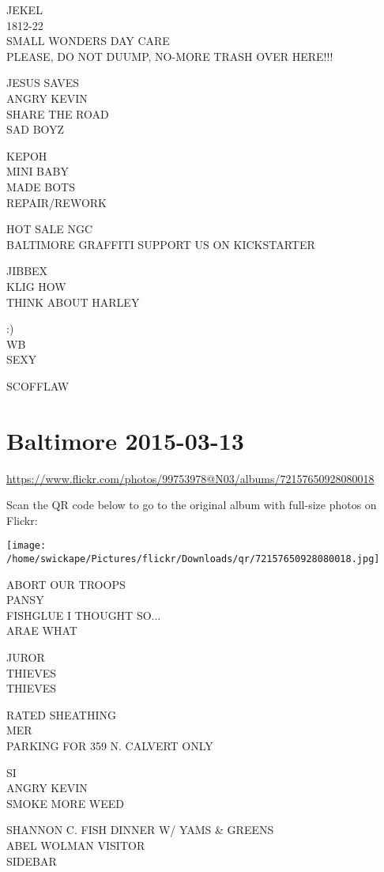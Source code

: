 \documentclass[10pt,letterpaper]{article}
\begin{document}
JEKEL\\
1812{-}22\\
SMALL WONDERS DAY CARE\\
PLEASE, DO NOT DUUMP, NO{-}MORE TRASH OVER HERE!!!

JESUS SAVES\\
ANGRY KEVIN\\
SHARE THE ROAD\\
SAD BOYZ

KEPOH\\
MINI BABY\\
MADE BOTS\\
REPAIR/REWORK

HOT SALE NGC\\
BALTIMORE GRAFFITI SUPPORT US ON KICKSTARTER

JIBBEX\\
KLIG HOW\\
THINK ABOUT HARLEY

:)\\
WB\\
SEXY

SCOFFLAW


\section*{Baltimore 2015-03-13}

\url{https://www.flickr.com/photos/99753978@N03/albums/72157650928080018}

Scan the QR code below to go to the original album with full-size photos on Flickr:

\texttt{[image: /home/swickape/Pictures/flickr/Downloads/qr/72157650928080018.jpg]}


ABORT OUR TROOPS\\
PANSY\\
FISHGLUE I THOUGHT SO...\\
ARAE WHAT

JUROR\\
THIEVES\\
THIEVES

RATED SHEATHING\\
MER\\
PARKING FOR 359 N. CALVERT ONLY

SI\\
ANGRY KEVIN\\
SMOKE MORE WEED

SHANNON C. FISH DINNER W/ YAMS \& GREENS\\
ABEL WOLMAN VISITOR\\
SIDEBAR
\end{document}
